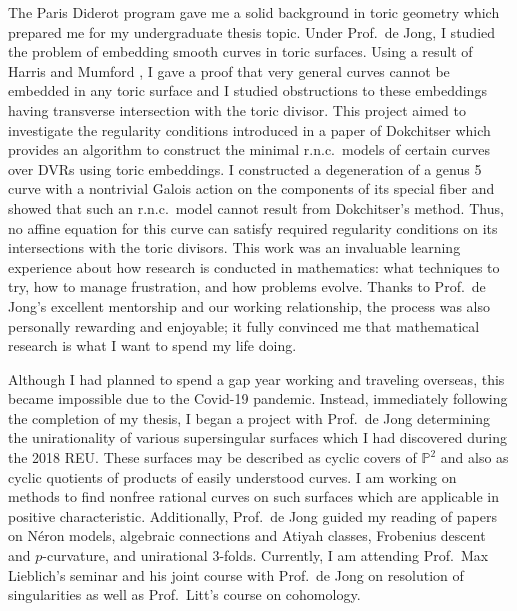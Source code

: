 \documentclass[11pt]{article}
\begin{document}
\par
The Paris Diderot program gave me a solid background in toric geometry which prepared me for my undergraduate thesis topic. Under Prof.\ de Jong, I studied the problem of embedding smooth curves in toric surfaces. Using a result of Harris and Mumford , I gave a proof that very general curves cannot be embedded in any toric surface and I studied obstructions to these embeddings having transverse intersection with the toric divisor. This project aimed to investigate the regularity conditions introduced in a paper of Dokchitser  which provides an algorithm to construct the minimal r.n.c.\ models of certain curves over DVRs using toric embeddings. I constructed a degeneration of a genus 5 curve with a nontrivial Galois action on the components of its special fiber and showed that such an r.n.c.\ model cannot result from Dokchitser's method. Thus, no affine equation for this curve can satisfy required regularity conditions on its intersections with the toric divisors. This work was an invaluable learning experience about how research is conducted in mathematics: what techniques to try, how to manage frustration, and how problems evolve. Thanks to Prof.\ de Jong’s excellent mentorship and our working relationship, the process was also personally rewarding and enjoyable; it fully convinced me that mathematical research is what I want to spend my life doing. 
\par 
Although I had planned to spend a gap year working and traveling overseas, this became impossible due to the Covid-19 pandemic. Instead, immediately following the completion of my thesis, I began a project with Prof.\ de Jong determining the unirationality of various supersingular surfaces which I had discovered during the 2018 REU. These surfaces may be described as cyclic covers of $\mathbb{P}^2$ and also as cyclic quotients of products of easily understood curves. I am working on methods to find nonfree rational curves on such surfaces which are applicable in positive characteristic. Additionally, Prof.\ de Jong guided my reading of papers on N\'{e}ron models, algebraic connections and Atiyah classes, Frobenius descent and $p$-curvature, and unirational $3$-folds. Currently, I am attending Prof.\ Max Lieblich's seminar and his joint course with Prof.\ de Jong on resolution of singularities as well as Prof.\ Litt's course on \etale cohomology.
\par
\end{document}
